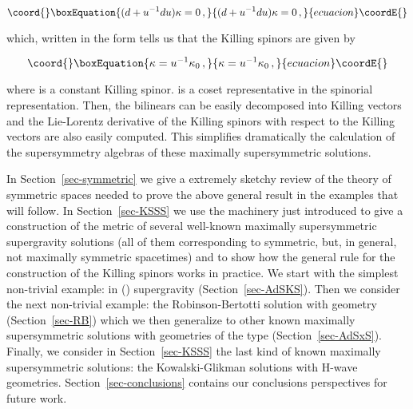 \documentclass[12pt,a4paper]{article}
\begin{document}
\begin{equation}\coord{}\boxEquation{
\label{eq:KSEu}
(d +u^{-1} du)\kappa=0\, , 
}{
(d +u^{-1} du)\kappa=0\, , 
}{ecuacion}\coordE{}\end{equation}

\noindent 
which, written in the form \coordHE{} tells us that the
Killing spinors are given by 

\begin{equation}\coord{}\boxEquation{
\kappa = u^{-1}\kappa_{0}\, ,  
}{
\kappa = u^{-1}\kappa_{0}\, ,  
}{ecuacion}\coordE{}\end{equation}

\noindent
where \coordHE{} is a constant Killing spinor. \coordHE{} is a coset
representative in the spinorial representation.  Then, the bilinears
\myHighlight{$\bar{\kappa}\gamma^{\mu}\kappa$}\coordHE{} can be easily decomposed into Killing
vectors and the Lie-Lorentz derivative of the Killing spinors with
respect to the Killing vectors are also easily computed. This
simplifies dramatically the calculation of the supersymmetry algebras
of these maximally supersymmetric solutions.

In Section~\ref{sec-symmetric} we give a extremely sketchy review of
the theory of symmetric spaces needed to prove the above general
result in the examples that will follow.  In Section~\ref{sec-KSSS} we
use the machinery just introduced to give a construction of the metric
of several well-known maximally supersymmetric supergravity solutions
(all of them corresponding to symmetric, but, in general, not
maximally symmetric spacetimes) and to show how the general rule for
the construction of the Killing spinors works in practice. We start
with the simplest non-trivial example: \coordHE{} in \coordHE{} (\coordHE{})
supergravity (Section~\ref{sec-AdSKS}). Then we consider the next
non-trivial example: the Robinson-Bertotti solution with geometry
\coordHE{} (Section~\ref{sec-RB}) which we then generalize
to other known maximally supersymmetric solutions with geometries of
the type \coordHE{} (Section~\ref{sec-AdSxS}).  Finally, we
consider in Section~\ref{sec-KSSS} the last kind of known maximally
supersymmetric solutions: the Kowalski-Glikman solutions with
H\coordHE{}-wave geometries.  Section~\ref{sec-conclusions} contains our
conclusions perspectives for future work.
\end{document}
